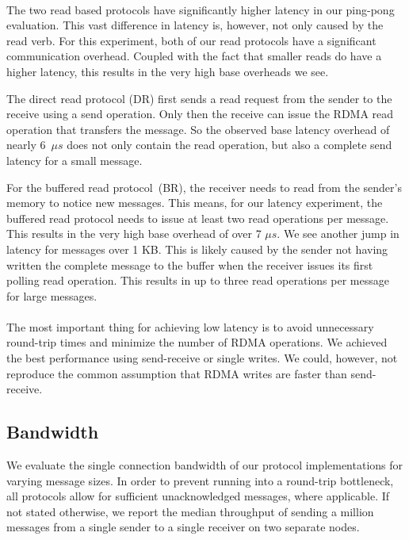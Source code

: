 \paragraph{} The two read based protocols have significantly higher latency in our ping-pong evaluation. This vast
difference in latency 
is, however, not only caused by the read verb. For this experiment, both of our read protocols have a significant 
communication overhead. Coupled with the fact that smaller reads do have a higher latency, this results in the very high
base overheads we see.

The direct read protocol (DR) first sends a read request from the sender to the receive using a send operation. Only then the
receive can issue the RDMA read operation that transfers the message. So the observed base latency overhead of 
nearly 6~$\mu s$
does not only contain the read operation, but also a complete send latency for a small message.

For the buffered read protocol~(BR), the receiver needs to read from the sender's memory to notice new messages. 
This means, for our
latency experiment, the buffered read protocol needs to issue at least two read operations per message. This results in the
very high base overhead of over 7 $\mu s$. We see another jump in latency for messages over 1 KB. This is likely caused by the
sender not having written the complete message to the buffer when the receiver issues its first polling read operation. 
This results in up to three read operations per message for large messages.

\paragraph{} The most important thing for achieving low 
latency is to avoid unnecessary round-trip times and minimize the number of RDMA operations. We achieved the best
performance  using send-receive or single writes. We could, however, not reproduce the common assumption that RDMA writes 
are faster than send-receive.






\pagebreak

\subsection{Bandwidth}

We evaluate the single connection bandwidth of our protocol implementations for varying message sizes. 
In order to prevent running into a round-trip bottleneck, all protocols allow for sufficient unacknowledged messages, where
applicable.
If not 
stated otherwise, we report the median throughput of sending a million messages from a single sender to a single receiver
on two separate nodes.

